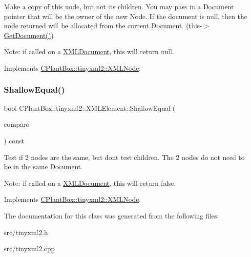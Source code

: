 Make a copy of this node, but not its children. You may pass in a Document pointer that will be the owner of the new Node. If the \textquotesingle{}document\textquotesingle{} is null, then the node returned will be allocated from the current Document. (this-\/$>$\hyperlink{classCPlantBox_1_1tinyxml2_1_1XMLNode_ac0d1a9be320497a51e7a202881a2352e}{Get\+Document()})

Note\+: if called on a \hyperlink{classCPlantBox_1_1tinyxml2_1_1XMLDocument}{X\+M\+L\+Document}, this will return null. 

Implements \hyperlink{classCPlantBox_1_1tinyxml2_1_1XMLNode_a8439e4e87206b26bc03427ffac3e882a}{C\+Plant\+Box\+::tinyxml2\+::\+X\+M\+L\+Node}.

\mbox{\label{classCPlantBox_1_1tinyxml2_1_1XMLElement_a12871a9760eb6ddbd564b512b3c11f0e}} 
\subsubsection{\texorpdfstring{Shallow\+Equal()}{ShallowEqual()}}
{\footnotesize\ttfamily bool C\+Plant\+Box\+::tinyxml2\+::\+X\+M\+L\+Element\+::\+Shallow\+Equal (\begin{DoxyParamCaption}\item[{const \hyperlink{classCPlantBox_1_1tinyxml2_1_1XMLNode}{X\+M\+L\+Node} $\ast$}]{compare }\end{DoxyParamCaption}) const\hspace{0.3cm}{\ttfamily [virtual]}}

Test if 2 nodes are the same, but don\textquotesingle{}t test children. The 2 nodes do not need to be in the same Document.

Note\+: if called on a \hyperlink{classCPlantBox_1_1tinyxml2_1_1XMLDocument}{X\+M\+L\+Document}, this will return false. 

Implements \hyperlink{classCPlantBox_1_1tinyxml2_1_1XMLNode_a1019a06dab15152f06f3a879bf9a85c9}{C\+Plant\+Box\+::tinyxml2\+::\+X\+M\+L\+Node}.



The documentation for this class was generated from the following files\+:\begin{DoxyCompactItemize}
\item 
src/tinyxml2.\+h\item 
src/tinyxml2.\+cpp\end{DoxyCompactItemize}
